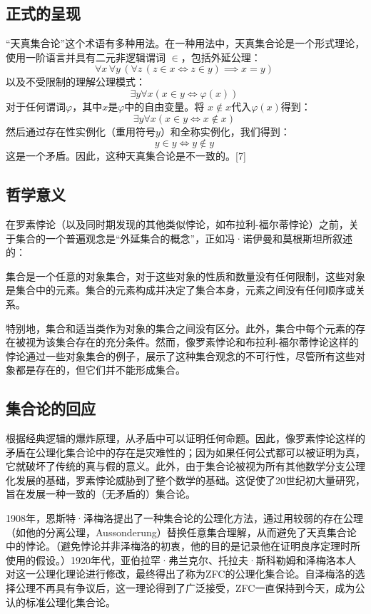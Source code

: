 \subsection{正式的呈现}  
“天真集合论”这个术语有多种用法。在一种用法中，天真集合论是一个形式理论，使用一阶语言并具有二元非逻辑谓词  
\(\in\)，包括外延公理：
\[
\forall x\,\forall y\,(\forall z\,(z \in x \iff z \in y) \implies x = y)~
\]
以及不受限制的理解公理模式：
\[
\exists y \forall x (x \in y \iff \varphi(x))~
\]
对于任何谓词\(\varphi\)，其中\(x\)是\(\varphi\)中的自由变量。将  
\(x \notin x\)代入\(\varphi(x)\)得到：
\[
\exists y \forall x (x \in y \iff x \notin x)~
\]
然后通过存在性实例化（重用符号\(y\)）和全称实例化，我们得到：
\[
y \in y \iff y \notin y~
\]
这是一个矛盾。因此，这种天真集合论是不一致的。[7]
\subsection{哲学意义}  
在罗素悖论（以及同时期发现的其他类似悖论，如布拉利-福尔蒂悖论）之前，关于集合的一个普遍观念是“外延集合的概念”，正如冯·诺伊曼和莫根斯坦所叙述的：

集合是一个任意的对象集合，对于这些对象的性质和数量没有任何限制，这些对象是集合中的元素。集合的元素构成并决定了集合本身，元素之间没有任何顺序或关系。

特别地，集合和适当类作为对象的集合之间没有区分。此外，集合中每个元素的存在被视为该集合存在的充分条件。然而，像罗素悖论和布拉利-福尔蒂悖论这样的悖论通过一些对象集合的例子，展示了这种集合观念的不可行性，尽管所有这些对象都是存在的，但它们并不能形成集合。
\subsection{集合论的回应}  
根据经典逻辑的爆炸原理，从矛盾中可以证明任何命题。因此，像罗素悖论这样的矛盾在公理化集合论中的存在是灾难性的；因为如果任何公式都可以被证明为真，它就破坏了传统的真与假的意义。此外，由于集合论被视为所有其他数学分支公理化发展的基础，罗素悖论威胁到了整个数学的基础。这促使了20世纪初大量研究，旨在发展一种一致的（无矛盾的）集合论。

1908年，恩斯特·泽梅洛提出了一种集合论的公理化方法，通过用较弱的存在公理（如他的分离公理，Aussonderung）替换任意集合理解，从而避免了天真集合论中的悖论。（避免悖论并非泽梅洛的初衷，他的目的是记录他在证明良序定理时所使用的假设。）1920年代，亚伯拉罕·弗兰克尔、托拉夫·斯科勒姆和泽梅洛本人对这一公理化理论进行修改，最终得出了称为ZFC的公理化集合论。自泽梅洛的选择公理不再具有争议后，这一理论得到了广泛接受，ZFC一直保持到今天，成为公认的标准公理化集合论。


